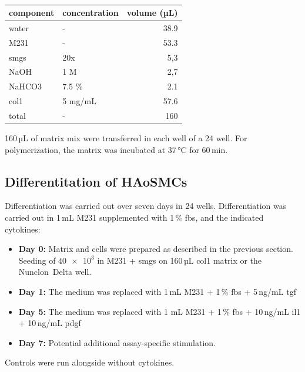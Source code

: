     \begin{table}[h]
    \capstart
	\centering
	\begin{minipage}{\captionwidth}
	   	\caption[Col I matrix]{}
	   	\label{tab:matrix}
	\end{minipage}
    \begin{tabular}{|l|l|r|}
        \hline
        component & concentration & volume (µL) \\ \hline
        \ac{water}       & -             & 38.9        \\
        \ac{M231}      & -             & 53.3        \\
        \ac{smgs}      & 20x           & 5,3         \\
        NaOH      & 1 M           & 2,7         \\
        NaHCO3    & 7.5 \%        & 2.1         \\
        \ac{col1}    & 5 mg/mL       & 57.6        \\ \hline
        total     & -             & 160         \\ \hline
    \end{tabular}
    \end{table}

    160\,µL of matrix mix were transferred in each well of a \ac{24 well}. For polymerization, the matrix was incubated at 37\,°C for 60\,min.

    \subsection{Differentitation of HAoSMCs}
    \label{subsec:differentiation}
    Differentiation was carried out over seven days in \acp{24 well}. Differentiation was carried out in 1\,mL M231 supplemented with 1\,\% \ac{fbs}, and the indicated cytokines:
    \begin{itemize}
        \item \textbf{Day 0:} Matrix and cells were prepared as described in the previous section. Seeding of $\num{40e3}$ in \ac{M231} + \ac{smgs} on 160\,µL \ac{col1} matrix or the Nunclon\texttrademark~Delta well.
        \item \textbf{Day 1:} The medium was replaced with 1\,mL M231 + 1\,\% \ac{fbs} + 5\,ng/mL \ac{tgf}
        \item \textbf{Day 5:} The medium was replaced with 1 mL M231 + 1\,\% \ac{fbs} + 10\,ng/mL \ac{il1} + 10\,ng/mL \ac{pdgf}
        \item \textbf{Day 7:} Potential additional assay-specific stimulation.
    \end{itemize}
    Controls were run alongside without cytokines.

